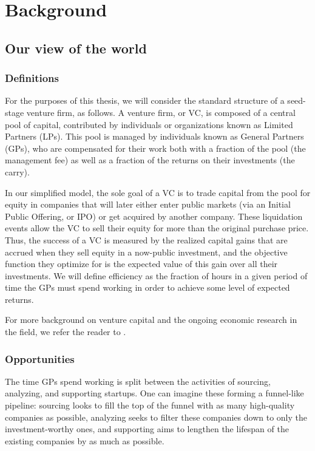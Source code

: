 \chapter{Background}
\section{Our view of the world}

\subsection{Definitions}

For the purposes of this thesis, we will consider the standard structure of a seed-stage venture firm, as follows. A venture firm, or VC, is composed of a central pool of capital, contributed by individuals or organizations known as Limited Partners (LPs). This pool is managed by individuals known as General Partners (GPs), who are compensated for their work both with a fraction of the pool (the management fee) as well as a fraction of the returns on their investments (the carry).

In our simplified model, the sole goal of a VC is to trade capital from the pool for equity in companies that will later either enter public markets (via an Initial Public Offering, or IPO) or get acquired by another company. These liquidation events allow the VC to sell their equity for more than the original purchase price. Thus, the success of a VC is measured by the realized capital gains that are accrued when they sell equity in a now-public investment, and the objective function they optimize for is the expected value of this gain over all their investments. We will define efficiency as the fraction of hours in a given period of time the GPs must spend working in order to achieve some level of expected returns.

For more background on venture capital and the ongoing economic research in the field, we refer the reader to \cite{venture-survey}.

\subsection{Opportunities}

The time GPs spend working is split between the activities of sourcing, analyzing, and supporting startups. One can imagine these forming a funnel-like pipeline: sourcing looks to fill the top of the funnel with as many high-quality companies as possible, analyzing seeks to filter these companies down to only the investment-worthy ones, and supporting aims to lengthen the lifespan of the existing companies by as much as possible.

